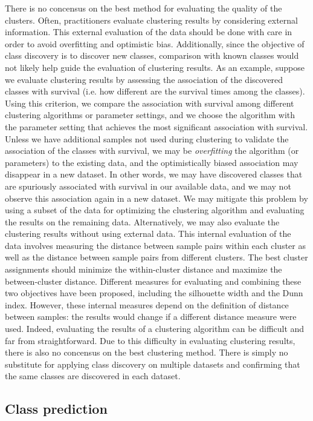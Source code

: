 There is no concensus on the best method for evaluating the quality of the clusters. Often, practitioners evaluate clustering results by considering external information. This external evaluation of the data should be done with care in order to avoid overfitting and optimistic bias. Additionally, since the objective of class discovery is to discover new classes, comparison with known classes would not likely help guide the evaluation of clustering results. As an example, suppose we evaluate clustering results by assessing the association of the discovered classes with survival (i.e. how different are the survival times among the classes). Using this criterion, we compare the association with survival among different clustering algorithms or parameter settings, and we choose the algorithm with the parameter setting that achieves the most significant association with survival. Unless we have additional samples not used during clustering to validate the association of the classes with survival, we may be \emph{overfitting} the algorithm (or parameters) to the existing data, and the optimistically biased association may disappear in a new dataset. In other words, we may have discovered classes that are spuriously associated with survival in our available data, and we may not observe this association again in a new dataset. We may mitigate this problem by using a subset of the data for optimizing the clustering algorithm and evaluating the results on the remaining data. Alternatively, we may also evaluate the clustering results without using external data. This internal evaluation of the data involves measuring the distance between sample pairs within each cluster as well as the distance between sample pairs from different clusters. The best cluster assignments should minimize the within-cluster distance and maximize the between-cluster distance. Different measures for evaluating and combining these two objectives have been proposed, including the silhouette width and the Dunn index. However, these internal measures depend on the definition of distance between samples: the results would change if a different distance measure were used. Indeed, evaluating the results of a clustering algorithm can be difficult and far from straightforward. Due to this difficulty in evaluating clustering results, there is also no concensus on the best clustering method. There is simply no substitute for applying class discovery on multiple datasets and confirming that the same classes are discovered in each dataset.

\subsection{Class prediction}

